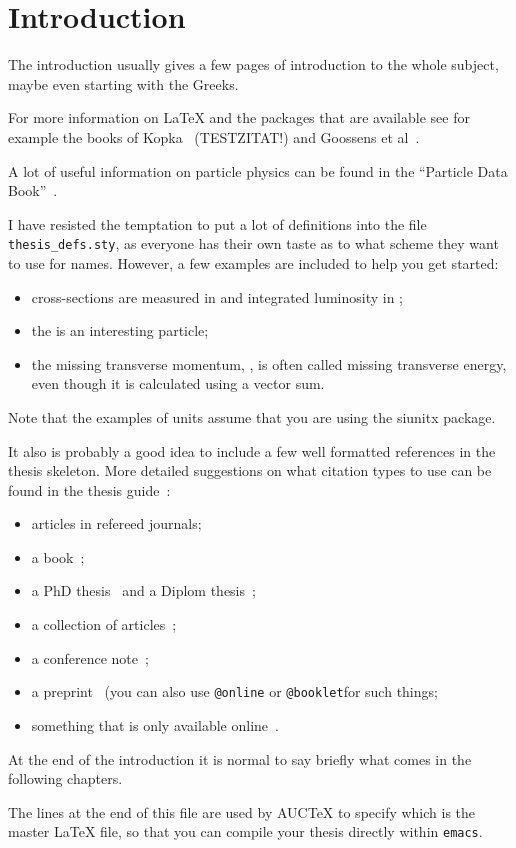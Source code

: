 \chapter{Introduction}
\label{sec:intro}

The introduction usually gives a few pages of introduction to the
whole subject, maybe even starting with the Greeks.

For more information on \LaTeX{} and the packages that are available
see for example the books of Kopka~\cite{kopka04} (TESTZITAT!) and Goossens et
al~.

A lot of useful information on particle physics can be found in the
\enquote{Particle Data Book}~.

I have resisted the temptation to put a lot of definitions into the
file \texttt{thesis\_defs.sty}, as everyone has their own taste as
to what scheme they want to use for names. However, a few examples
are included to help you get started:
\begin{itemize}
\setlength{\itemsep}{0pt}\setlength{\parskip}{0pt}
\item cross-sections are measured in \si{\pb} and integrated
  luminosity in \si{\invpb};
\item the \KoS is an interesting particle;
\item the missing transverse momentum, \pTmiss, is often called
  missing transverse energy, even though it is calculated using a vector sum.
\end{itemize}
Note that the examples of units assume that you are using the
\textsf{siunitx} package.

It also is probably a good idea to include a few well formatted
references in the thesis skeleton. More detailed suggestions on what
citation types to use can be found in the thesis
guide~:
\begin{itemize}
\item articles in refereed journals;
\item a book~;
\item a PhD thesis~ and a Diplom thesis~;
\item a collection of articles~;
\item a conference note~;
\item a preprint~ (you can also use
  \texttt{@online} or \texttt{@booklet}for such things;
\item something that is only available online~.
\end{itemize}

At the end of the introduction it is normal to say briefly what comes
in the following chapters.

The lines at the end of this file are used by AUCTeX to specify which
is the master \LaTeX{} file, so that you can compile your thesis
directly within \texttt{emacs}.


